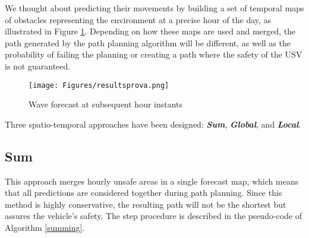 We thought about predicting their movements by building a set of temporal maps of obstacles representing the environment at a precise hour of the day, as illustrated in Figure \ref{temporalslice}. Depending on how these maps are used and merged, the path generated by the path planning algorithm will be different, as well as the probability of failing the planning or creating a path where the safety of the USV is not guaranteed.\\
\begin{figure}[H]
	\centering
	\texttt{[image: Figures/resultsprova.png]}
	\caption{Wave forecast at subsequent hour instants}
	\label{temporalslice}
\end{figure} 
\noindent
Three spatio-temporal approaches have been designed: \textbf{\textit{Sum}}, \textbf{\textit{Global}}, and \textbf{\textit{Local}}. 
\begin{comment}
	\subsection{Algorithm comparison}
	The three algorithms examined are:
	\begin{itemize}[itemsep=0pt]
		\item Potential field method
		\item a searching-based method: A*
		\item a sampling-based method: RRT (and RRT*)
	\end{itemize}
	I compared the 3 path planning and collision avoidance algorithms using 3 different approaches in order to evaluate their performance on the same level.\\
\end{comment}
\subsection{Sum}
This approach merges hourly unsafe areas in a single forecast map, which means that all predictions are considered together during path planning. Since this method is highly conservative, the resulting path will not be the shortest but assures the vehicle's safety. The step procedure is described in the pseudo-code of Algorithm \ref{summing}.

